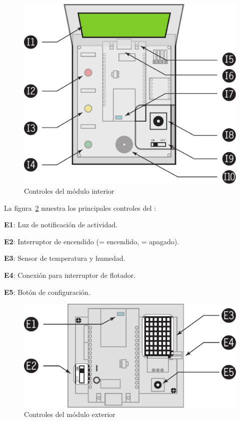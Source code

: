 \begin{figure}
  \centering
  \includegraphics[width=0.8\columnwidth]{../design/interior-controls}
  \caption{Controles del módulo interior}
  \label{fig:interior-controls}
\end{figure}

La figura~\ref{fig:exterior-controls} muestra los principales controles del \ME:

\begin{enumeratecompact}
  \item[\textbf{\color{main}E1}:] Luz de notificación de actividad.
  \item[\textbf{\color{main}E2}:] Interruptor de encendido (\on = encendido, \off = apagado).
  \item[\textbf{\color{main}E3}:] Sensor de temperatura y humedad.
  \item[\textbf{\color{main}E4}:] Conexión para interruptor de flotador.
  \item[\textbf{\color{main}E5}:] Botón de configuración.
\end{enumeratecompact}

\begin{figure}
  \centering
  \includegraphics[width=0.8\columnwidth]{../design/exterior-controls}
  \caption{Controles del módulo exterior}
  \label{fig:exterior-controls}
\end{figure}